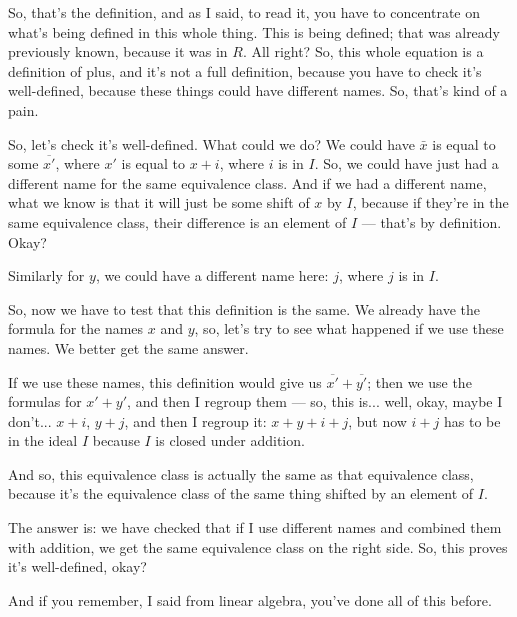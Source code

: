 \begin{speech}[00:39:08 - 00:40:48]
So, that's the definition, and as I said, to read it, you have to concentrate on what's being defined in this whole thing. This is being defined; that was already previously known, because it was in $R$. All right? So, this whole equation is a definition of plus, and it's not a full definition, because you have to check it's well-defined, because these things could have different names. So, that's kind of a pain. 

So, let's check it's well-defined.  What could we do? We could have $\bar{x}$ is equal to some $\overline{x'}$,  where $x'$ is equal to $x + i$,  where $i$ is in $I$.  So, we could have just had a different name for the same equivalence class. And if we had a different name, what we know is that it will just be some shift of $x$ by $I$, because if they're in the same equivalence class, their difference is an element of $I$ --- that's by definition. Okay? 

Similarly for $y$, we could have a different name here:  $j$, where $j$ is in $I$. 

So, now we have to test that this definition is the same. We already have the formula for the names $x$ and $y$, so, let's try to see what happened if we use these names. We better get the same answer.
\end{speech}

\begin{speech}[00:40:48 - 00:42:05]
If we use these names, this definition would give us $\overline{x'} + \overline{y'}$;  then we use the formulas for $x' + y'$, and then I regroup them --- so, this is... well, okay, maybe I don't...  $x + i$, $y + j$, and then I regroup it: $x + y + i + j$,  but now $i + j$ has to be in the ideal $I$ because $I$ is closed under addition. 

And so, this equivalence class is actually the same as that equivalence class, because it's the equivalence class of the same thing shifted by an element of $I$. 

The answer is: we have checked that if I use different names and combined them with addition, we get the same equivalence class on the right side. So, this proves it's well-defined, okay? 

And if you remember, I said from linear algebra, you've done all of this before.
\end{speech}

